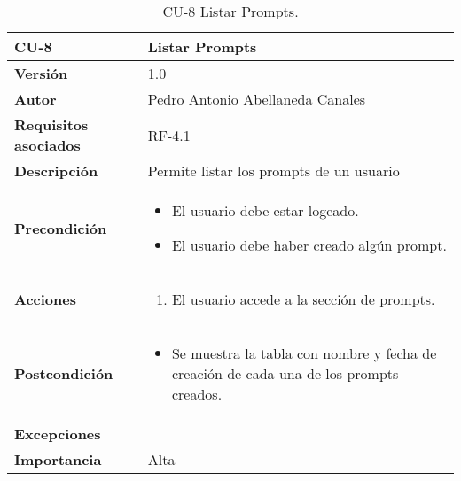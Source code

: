 \begin{table}[p]
	\centering
	\begin{tabularx}{\linewidth}{ p{} p{} }
		\toprule
		\textbf{CU-8}    & \textbf{Listar Prompts} \\
		\midrule
		\textbf{Versión}              & 1.0    \\
		\textbf{Autor}                & Pedro Antonio Abellaneda Canales \\
		\textbf{Requisitos asociados} & RF-4.1 \\
		\textbf{Descripción}          & Permite listar los prompts de un usuario \\
		\textbf{Precondición}         
        & 
        \begin{itemize} 
            \item El usuario debe estar logeado.
            \item  El usuario debe haber creado algún prompt.
        \end{itemize}  
        \\
		\textbf{Acciones}             &
		\begin{enumerate}
			\def\labelenumi{\arabic{enumi}.}
			\tightlist
			\item El usuario accede a la sección de prompts.
		\end{enumerate} \\
		\textbf{Postcondición}        
        & 
        \begin{itemize} 
            \item Se muestra la tabla con nombre y fecha de creación de cada una de los prompts creados.
        \end{itemize}  
        \\ 
		\textbf{Excepciones}          
        & 
        \\ 
		\textbf{Importancia}          & Alta \\
		\bottomrule
	\end{tabularx}
	\caption{CU-8 Listar Prompts.}
	\label{tab:CU-8}
\end{table}